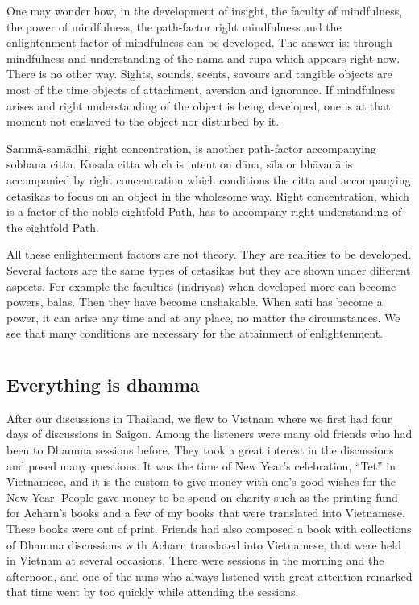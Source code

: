 One may wonder how, in the development of insight, the faculty of
mindfulness, the power of mindfulness, the path-factor right mindfulness
and the enlightenment factor of mindfulness can be developed. The answer
is: through mindfulness and understanding of the nāma and rūpa which
appears right now. There is no other way. Sights, sounds, scents,
savours and tangible objects are most of the time objects of attachment,
aversion and ignorance. If mindfulness arises and right understanding of
the object is being developed, one is at that moment not enslaved to the
object nor disturbed by it.

Sammā-samādhi, right concentration, is another path-factor accompanying
sobhana citta. Kusala citta which is intent on dāna, sīla or bhāvanā is
accompanied by right concentration which conditions the citta and
accompanying cetasikas to focus on an object in the wholesome way. Right
concentration, which is a factor of the noble eightfold Path, has to
accompany right understanding of the eightfold Path.

All these enlightenment factors are not theory. They are realities to be
developed. Several factors are the same types of cetasikas but they are
shown under different aspects. For example the faculties (indriyas) when
developed more can become powers, balas. Then they have become
unshakable. When sati has become a power, it can arise any time and at
any place, no matter the circumstances. We see that many conditions are
necessary for the attainment of enlightenment.


\chapter[Everything is dhamma]{}
\section*{Everything is dhamma}

After our discussions in Thailand, we flew to Vietnam where we first had
four days of discussions in Saigon. Among the listeners were many old
friends who had been to Dhamma sessions before. They took a great
interest in the discussions and posed many questions. It was the time of
New Year's celebration, ``Tet'' in Vietnamese, and it is the custom to
give money with one's good wishes for the New Year. People gave money to
be spend on charity such as the printing fund for Acharn's books and a
few of my books that were translated into Vietnamese. These books were
out of print. Friends had also composed a book with collections of
Dhamma discussions with Acharn translated into Vietnamese, that were
held in Vietnam at several occasions. There were sessions in the morning
and the afternoon, and one of the nuns who always listened with great
attention remarked that time went by too quickly while attending the
sessions.

